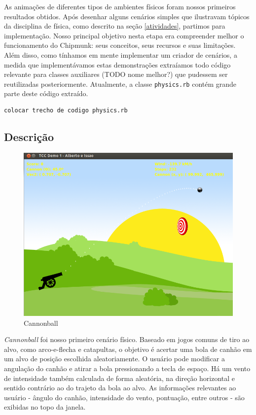 As animações de diferentes tipos de ambientes físicos foram nossos primeiros resultados obtidos. Após desenhar alguns cenários simples que ilustravam tópicos da disciplina de física, como descrito na seção \ref{atividades}, partimos para implementação. Nosso principal objetivo nesta etapa era compreender melhor o funcionamento do Chipmunk: seus conceitos, seus recursos e suas limitações. \\

Além disso, como tínhamos em mente implementar um criador de cenários, a medida que implementávamos estas demonstrações extraíamos todo código relevante para classes auxiliares (TODO nome melhor?) que pudessem ser reutilizadas posteriormente. Atualmente, a classe {\tt physics.rb} contém grande parte deste código extraído. \\

\begin{lstlisting}
colocar trecho de codigo physics.rb
\end{lstlisting}

\subsection{Descrição}

\begin{figure}[H]
	\centering
	\includegraphics[scale=0.4]{images/cannonball.png}
	\caption{Cannonball}
	\hspace{0.5cm}
\end{figure}

\textit{Cannonball} foi nosso primeiro cenário físico. Baseado em jogos comuns de tiro ao alvo, como arco-e-flecha e catapultas, o objetivo é acertar uma bola de canhão em um alvo de posição escolhida aleatoriamente. O usuário pode modificar a angulação do canhão e atirar a bola pressionando a tecla de espaço. Há um vento de intensidade também calculada de forma aleatória, na direção horizontal e sentido contrário ao do trajeto da bola ao alvo. As informações relevantes ao usuário - ângulo do canhão, intensidade do vento, pontuação, entre outros - são exibidas no topo da janela. \\

